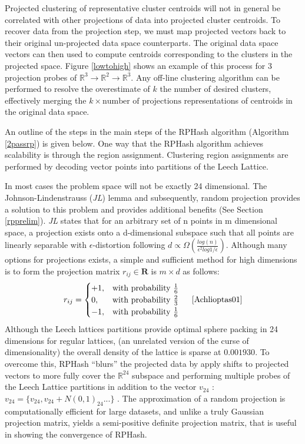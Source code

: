 Projected clustering of representative cluster centroids will not in general be correlated with other projections of
data into projected cluster centroids.  To recover data from the projection step, we must map projected vectors back to
their original un-projected data space counterparts. The original data space vectors can then used to compute centroids
corresponding to the clusters in the projected space.  Figure \ref{lowtohigh} shows an example of this process for 3
projection probes of $\mathbb{R}^{3}\rightarrow \mathbb{R}^2 \rightarrow \mathbb{R}^3$.  Any off-line clustering
algorithm can be performed to resolve the overestimate of $k$ the number of desired clusters, effectively merging the
$k\times \text{number of projections}$ representations of centroids in the original data space.

An outline of the steps in the main steps of the \textsf{RPHash} algorithm (Algorithm \ref{2passrp}) is given below.  One
way that the \textsf{RPHash} algorithm achieves scalability is through the region assignment.  Clustering region
assignments are performed by decoding vector points into partitions of the Leech Lattice.

In most cases the problem space will not be exactly 24 dimensional.  The Johnson-Lindenstrauss (\emph{JL}) lemma and
subsequently, random projection provides a solution to this problem and provides additional benefits (See Section \ref{rpprelim}).
\emph{JL} states that for an arbitrary set of n points in m dimensional space, a projection exists onto a d-dimensional
subspace such that all points are linearly separable with $\epsilon$-distortion following $d \propto {\Omega({\frac{
      log(n) } {\epsilon^2 log 1/\epsilon} })}$.  Although many options for projections exists, a simple and sufficient
method for high dimensions is to form the projection matrix $r_{ij}\in\textbf{R}$ is $m\times d$ as follows:
\[
    r_{ij}= 
\begin{cases}
    +1, & \text{with probability } {\frac{1}{6}}\\
     0, & \text{with probability } {\frac{2}{3}}\\
    -1, & \text{with probability } {\frac{1}{6}}\\
\end{cases}\text{\ \ \ \ \cite{Achlioptas01}}
\]
Although the Leech lattices partitions provide optimal sphere packing in 24 dimensions for regular lattices, (an
unrelated version of the curse of dimensionality) the overall density of the lattice is sparse at $ 0.001930 $.  To
overcome this, \textsf{RPHash} ``blurs'' the projected data by apply shifts to projected vectors to more fully cover the
$\mathbb{R}^{24}$ subspace and performing multiple probes of the Leech Lattice partitions in addition to the vector
$v_{24}$ : $v_{24} = \{ v_{24}, v_{24}+N(0,1)_{24}... \}$ .  The approximation of a random projection is computationally efficient for large datasets, and unlike a truly Gaussian
projection matrix, yields a semi-positive definite projection matrix, that is useful in showing the convergence of
\textsf{RPHash}.


